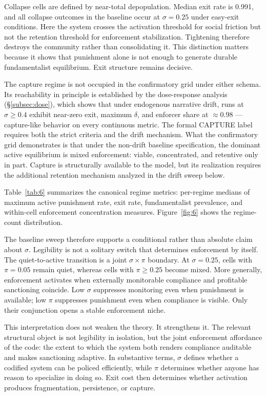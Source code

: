 \documentclass[12pt]{article}
\begin{document}
Collapse cells are defined by near-total depopulation. Median exit rate is 0.991, and all collapse outcomes in the baseline occur at $\sigma = 0.25$ under easy-exit conditions. Here the system crosses the activation threshold for social friction but not the retention threshold for enforcement stabilization. Tightening therefore destroys the community rather than consolidating it. This distinction matters because it shows that punishment alone is not enough to generate durable fundamentalist equilibrium. Exit structure remains decisive.

The capture regime is not occupied in the confirmatory grid under either schema. Its reachability in principle is established by the dose-response analysis (\S\ref{subsec:dose}), which shows that under endogenous narrative drift, runs at $\sigma \geq 0.4$ exhibit near-zero exit, maximum $\delta$, and enforcer share at $\approx 0.98$ --- capture-like behavior on every continuous metric. The formal CAPTURE label requires both the strict criteria and the drift mechanism. What the confirmatory grid demonstrates is that under the non-drift baseline specification, the dominant active equilibrium is mixed enforcement: viable, concentrated, and retentive only in part. Capture is structurally available to the model, but its realization requires the additional retention mechanism analyzed in the drift sweep below.

Table~\ref{tab:6} summarizes the canonical regime metrics: per-regime medians of maximum active punishment rate, exit rate, fundamentalist prevalence, and within-cell enforcement concentration measures. Figure~\ref{fig:6} shows the regime-count distribution.



The baseline sweep therefore supports a conditional rather than absolute claim about $\sigma$. Legibility is not a solitary switch that determines enforcement by itself. The quiet-to-active transition is a joint $\sigma \times \pi$ boundary. At $\sigma = 0.25$, cells with $\pi = 0.05$ remain quiet, whereas cells with $\pi \geq 0.25$ become mixed. More generally, enforcement activates when externally monitorable compliance and profitable sanctioning coincide. Low $\sigma$ suppresses monitoring even when punishment is available; low $\pi$ suppresses punishment even when compliance is visible. Only their conjunction opens a stable enforcement niche.

This interpretation does not weaken the theory. It strengthens it. The relevant structural object is not legibility in isolation, but the joint enforcement affordance of the code: the extent to which the system both renders compliance auditable and makes sanctioning adaptive. In substantive terms, $\sigma$ defines whether a codified system can be policed efficiently, while $\pi$ determines whether anyone has reason to specialize in doing so. Exit cost then determines whether activation produces fragmentation, persistence, or capture.
\end{document}
